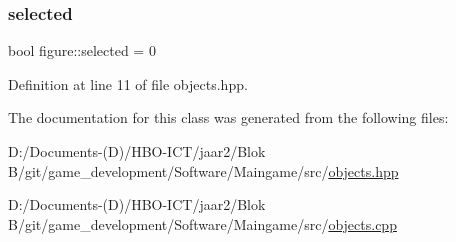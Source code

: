 \mbox{\label{classfigure_aaaf0bac968262da5781ddcfbb6bcb687}} 
\subsubsection{\texorpdfstring{selected}{selected}}
{\footnotesize\ttfamily bool figure\+::selected = 0}



Definition at line 11 of file objects.\+hpp.



The documentation for this class was generated from the following files\+:\begin{DoxyCompactItemize}
\item 
D\+:/\+Documents-\/(\+D)/\+H\+B\+O-\/\+I\+C\+T/jaar2/\+Blok B/git/game\+\_\+development/\+Software/\+Maingame/src/\hyperlink{objects_8hpp}{objects.\+hpp}\item 
D\+:/\+Documents-\/(\+D)/\+H\+B\+O-\/\+I\+C\+T/jaar2/\+Blok B/git/game\+\_\+development/\+Software/\+Maingame/src/\hyperlink{objects_8cpp}{objects.\+cpp}\end{DoxyCompactItemize}
